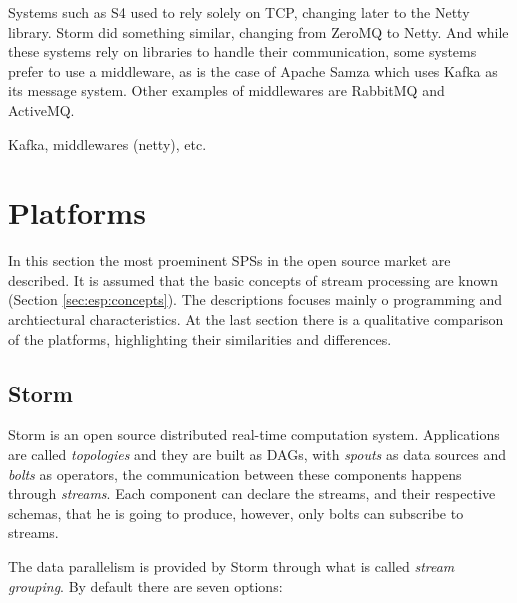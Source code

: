 \documentclass[ppgc,diss,english]{iiufrgs}
\begin{document}
Systems such as S4 used to rely solely on TCP, changing later to the Netty library. Storm did something similar, changing from ZeroMQ to Netty. And while these systems rely on libraries to handle their communication, some systems prefer to use a middleware, as is the case of Apache Samza which uses Kafka as its message system. Other examples of middlewares are RabbitMQ and ActiveMQ.

Kafka, middlewares (netty), etc.


\section{Platforms}
\label{sec:esp:platforms}

In this section the most proeminent SPSs in the open source market are described. It is assumed that the basic concepts of stream processing are known (Section \ref{sec:esp:concepts}). The descriptions focuses mainly o programming and archtiectural characteristics. At the last section there is a qualitative comparison of the platforms, highlighting their similarities and differences.

\subsection{Storm}

Storm is an open source distributed real-time computation system. Applications are called \emph{topologies} and they are built as DAGs, with \emph{spouts} as data sources and \emph{bolts} as operators, the communication between these components happens through \emph{streams}. Each component can declare the streams, and their respective schemas, that he is going to produce, however, only bolts can subscribe to streams.

The data parallelism is provided by Storm through what is called \emph{stream grouping}. By default there are seven options:
\end{document}
